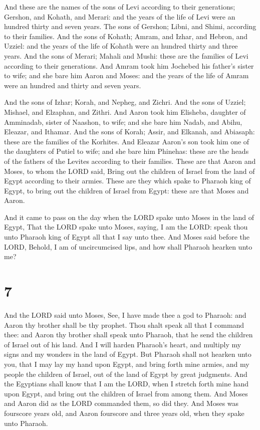  And these are the names of the sons of Levi according to
their generations; Gershon, and Kohath, and Merari: and the years of the
life of Levi were an hundred thirty and seven years.  The
sons of Gershon; Libni, and Shimi, according to their families.
 And the sons of Kohath; Amram, and Izhar, and Hebron, and
Uzziel: and the years of the life of Kohath were an hundred thirty and
three years.  And the sons of Merari; Mahali and Mushi:
these are the families of Levi according to their generations.
 And Amram took him Jochebed his father's sister to wife;
and she bare him Aaron and Moses: and the years of the life of Amram
were an hundred and thirty and seven years.

 And the sons of Izhar; Korah, and Nepheg, and Zichri.
 And the sons of Uzziel; Mishael, and Elzaphan, and Zithri.
 And Aaron took him Elisheba, daughter of Amminadab, sister
of Naashon, to wife; and she bare him Nadab, and Abihu, Eleazar, and
Ithamar.  And the sons of Korah; Assir, and Elkanah, and
Abiasaph: these are the families of the Korhites.  And
Eleazar Aaron's son took him one of the daughters of Putiel to wife; and
she bare him Phinehas: these are the heads of the fathers of the Levites
according to their families.  These are that Aaron and
Moses, to whom the LORD said, Bring out the children of Israel from the
land of Egypt according to their armies.  These are they
which spake to Pharaoh king of Egypt, to bring out the children of
Israel from Egypt: these are that Moses and Aaron.

 And it came to pass on the day when the LORD spake unto
Moses in the land of Egypt,  That the LORD spake unto
Moses, saying, I am the LORD: speak thou unto Pharaoh king of Egypt all
that I say unto thee.  And Moses said before the LORD,
Behold, I am of uncircumcised lips, and how shall Pharaoh hearken unto
me?

\hypertarget{section-6}{%
\section{7}\label{section-6}}

 And the LORD said unto Moses, See, I have made thee a god
to Pharaoh: and Aaron thy brother shall be thy prophet. 
Thou shalt speak all that I command thee: and Aaron thy brother shall
speak unto Pharaoh, that he send the children of Israel out of his land.
 And I will harden Pharaoh's heart, and multiply my signs
and my wonders in the land of Egypt.  But Pharaoh shall not
hearken unto you, that I may lay my hand upon Egypt, and bring forth
mine armies, and my people the children of Israel, out of the land of
Egypt by great judgments.  And the Egyptians shall know that
I am the LORD, when I stretch forth mine hand upon Egypt, and bring out
the children of Israel from among them.  And Moses and Aaron
did as the LORD commanded them, so did they.  And Moses was
fourscore years old, and Aaron fourscore and three years old, when they
spake unto Pharaoh.

